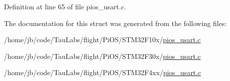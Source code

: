 \-Definition at line 65 of file pios\-\_\-usart.\-c.



\-The documentation for this struct was generated from the following files\-:\begin{DoxyCompactItemize}
\item 
/home/jb/code/\-Tau\-Labs/flight/\-Pi\-O\-S/\-S\-T\-M32\-F10x/\hyperlink{_s_t_m32_f10x_2pios__usart_8c}{pios\-\_\-usart.\-c}\item 
/home/jb/code/\-Tau\-Labs/flight/\-Pi\-O\-S/\-S\-T\-M32\-F30x/\hyperlink{_s_t_m32_f30x_2pios__usart_8c}{pios\-\_\-usart.\-c}\item 
/home/jb/code/\-Tau\-Labs/flight/\-Pi\-O\-S/\-S\-T\-M32\-F4xx/\hyperlink{_s_t_m32_f4xx_2pios__usart_8c}{pios\-\_\-usart.\-c}\end{DoxyCompactItemize}
